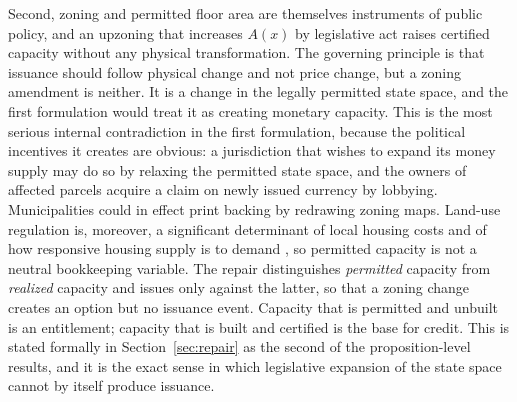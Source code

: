 \documentclass[11pt]{article}
\theoremstyle{definition}
\begin{document}
Second, zoning and permitted floor area are themselves instruments of public policy, and an upzoning that increases $A(x)$ by legislative act raises certified capacity without any physical transformation. The governing principle is that issuance should follow physical change and not price change, but a zoning amendment is neither. It is a change in the legally permitted state space, and the first formulation would treat it as creating monetary capacity. This is the most serious internal contradiction in the first formulation, because the political incentives it creates are obvious: a jurisdiction that wishes to expand its money supply may do so by relaxing the permitted state space, and the owners of affected parcels acquire a claim on newly issued currency by lobbying. Municipalities could in effect print backing by redrawing zoning maps. Land-use regulation is, moreover, a significant determinant of local housing costs and of how responsive housing supply is to demand \cite{glaeser2003, gyourko2008}, so permitted capacity is not a neutral bookkeeping variable. The repair distinguishes \emph{permitted} capacity from \emph{realized} capacity and issues only against the latter, so that a zoning change creates an option but no issuance event. Capacity that is permitted and unbuilt is an entitlement; capacity that is built and certified is the base for credit. This is stated formally in Section~\ref{sec:repair} as the second of the proposition-level results, and it is the exact sense in which legislative expansion of the state space cannot by itself produce issuance.
\end{document}
